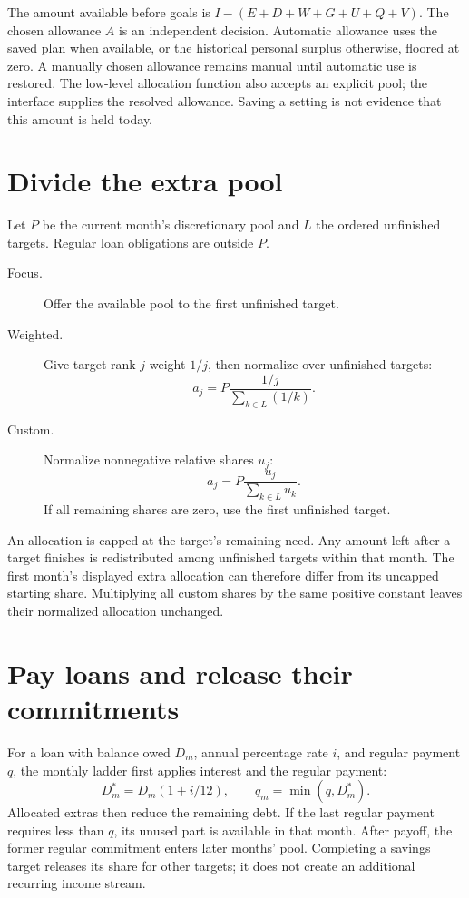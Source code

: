 The amount available before goals is \(I-(E+D+W+G+U+Q+V)\). The chosen allowance \(A\) is an independent decision. Automatic allowance uses the saved plan when available, or the historical personal surplus otherwise, floored at zero. A manually chosen allowance remains manual until automatic use is restored. The low-level allocation function also accepts an explicit pool; the interface supplies the resolved allowance. Saving a setting is not evidence that this amount is held today.

\section{Divide the extra pool}
Let \(P\) be the current month's discretionary pool and \(L\) the ordered unfinished targets. Regular loan obligations are outside \(P\).

\begin{description}
\item[Focus.] Offer the available pool to the first unfinished target.
\item[Weighted.] Give target rank \(j\) weight \(1/j\), then normalize over unfinished targets:
\[a_j=P\frac{1/j}{\sum_{k\in L}(1/k)}.\]
\item[Custom.] Normalize nonnegative relative shares \(u_j\):
\[a_j=P\frac{u_j}{\sum_{k\in L}u_k}.\]
If all remaining shares are zero, use the first unfinished target.
\end{description}

An allocation is capped at the target's remaining need. Any amount left after a target finishes is redistributed among unfinished targets within that month. The first month's displayed extra allocation can therefore differ from its uncapped starting share. Multiplying all custom shares by the same positive constant leaves their normalized allocation unchanged.

\section{Pay loans and release their commitments}
For a loan with balance owed \(D_m\), annual percentage rate \(i\), and regular payment \(q\), the monthly ladder first applies interest and the regular payment:
\[
 D_m^{*}=D_m(1+i/12),\qquad
 q_m=\min(q,D_m^{*}).
\]
Allocated extras then reduce the remaining debt. If the last regular payment requires less than \(q\), its unused part is available in that month. After payoff, the former regular commitment enters later months' pool. Completing a savings target releases its share for other targets; it does not create an additional recurring income stream.

